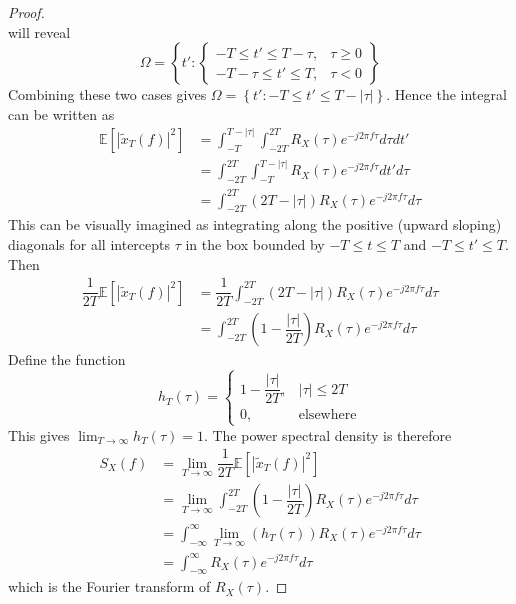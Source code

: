 \documentclass[11pt]{report} %
\begin{document}
\begin{proof}
\begin{equation}
\end{equation}
will reveal
\begin{equation}
\Omega = \left\{t': \begin{cases} -T \leq t' \leq T - \tau, & \tau \geq 0 \\ -T - \tau \leq t' \leq T, & \tau < 0\end{cases}\right\}
\end{equation}
Combining these two cases gives $\Omega = \left\{t': -T \leq t' \leq T - \left|\tau\right|\right\}$. Hence the integral can be written as
\begin{align}
\mathbb{E}\left[\left|\widetilde{x}_{T}\left(f\right)\right|^{2}\right] &= \int_{-T}^{T-\left|\tau\right|}\int_{-2T}^{2T}R_{X}\left(\tau\right)e^{-j2\pi f\tau}d\tau dt' \\
&= \int_{-2T}^{2T}\int_{-T}^{T-\left|\tau\right|}R_{X}\left(\tau\right)e^{-j2\pi f\tau}dt'd\tau \\
&= \int_{-2T}^{2T}\left(2T-\left|\tau\right|\right)R_{X}\left(\tau\right)e^{-j2\pi f\tau}d\tau
\end{align}
This can be visually imagined as integrating along the positive (upward sloping) diagonals for all intercepts $\tau$ in the box bounded by $-T\leq t \leq T$ and $-T \leq t'\leq T$. Then 
\begin{align}
\dfrac{1}{2T}\mathbb{E}\left[\left|\widetilde{x}_{T}\left(f\right)\right|^{2}\right] &= \dfrac{1}{2T}\int_{-2T}^{2T}\left(2T-\left|\tau\right|\right)R_{X}\left(\tau\right)e^{-j2\pi f\tau}d\tau \\
&= \int_{-2T}^{2T}\left(1-\dfrac{\left|\tau\right|}{2T}\right)R_{X}\left(\tau\right)e^{-j2\pi f\tau}d\tau
\end{align}
Define the function
\begin{equation}
h_{T}\left(\tau\right) = \begin{cases} 1 -\dfrac{\left|\tau\right|}{2T}, & \left|\tau\right| \leq 2T \\ 0, & \mathrm{elsewhere}\end{cases}
\end{equation}
This gives $\lim_{T\to\infty}h_{T}\left(\tau\right) = 1$. The power spectral density is therefore
\begin{align}
S_{X}\left(f\right) &= \lim_{T\to\infty}\dfrac{1}{2T}\mathbb{E}\left[\left|\widetilde{x}_{T}\left(f\right)\right|^{2}\right] \\
&= \lim_{T\to\infty}\int_{-2T}^{2T}\left(1-\dfrac{\left|\tau\right|}{2T}\right)R_{X}\left(\tau\right)e^{-j2\pi f\tau}d\tau \\
&= \int_{-\infty}^{\infty}\lim_{T\to\infty}\left(h_{T}\left(\tau\right)\right)R_{X}\left(\tau\right)e^{-j2\pi f\tau}d\tau \\
&= \int_{-\infty}^{\infty}R_{X}\left(\tau\right)e^{-j2\pi f\tau}d\tau
\end{align}
which is the Fourier transform of $R_{X}\left(\tau\right)$.
\end{proof}
\end{document}
